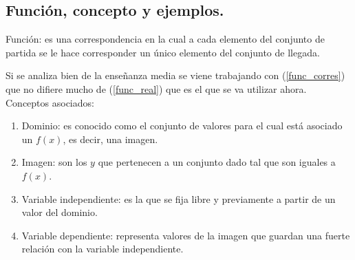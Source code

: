 \documentclass[10pt,twoside]{SelfArx} %
\begin{document}









\subsection{ Función, concepto y ejemplos.}


 

\begin{thm}\label{func_corres}
	 Función: es una correspondencia en la cual a cada elemento del conjunto de partida se le hace corresponder un único elemento del conjunto de llegada.\\
	 
\end{thm}
Si se analiza bien de la enseñanza media se viene trabajando con (\ref{func_corres}) que no difiere mucho de (\ref{func_real}) que es el que se va utilizar ahora.\\



Conceptos asociados:\\
\begin{enumerate}
	\item Dominio: es conocido como el conjunto de valores para el cual está asociado un $ f(x) $, es decir, una imagen.
	\item Imagen: son los $ y $ que pertenecen a un conjunto dado tal que son iguales a $ f(x) $.
	\item Variable independiente: es la que se fija libre y previamente a partir  de un valor del dominio.
	\item Variable dependiente: representa valores de la imagen que guardan una fuerte relaci\'on con la variable independiente.
\end{enumerate}
\end{document}
